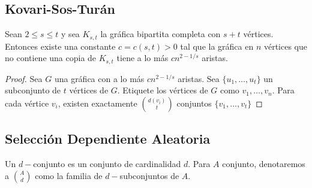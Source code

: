 \subsection{Kovari-Sos-Turán}
\begin{theorem}
Sean $2 \leq s \leq t$ y sea $K_{s,t}$ la gráfica bipartita
completa con $s + t$ vértices. Entonces existe una constante $c =
c(s, t) > 0$ tal que
la gráfica en $n$ vértices que no contiene una copia de $K_{s, t}$
tiene a lo más
$c n^{2 - 1/s}$ aristas.
\end{theorem}
\begin{proof}
Sea $G$ una gráfica con a lo más $cn^{2 - 1/s}$ aristas.
Sea $\{u_1, \ldots, u_t\}$ un subconjunto de $t$ vértices de $G$.
Etiquete los vértices de $G$ como $v_1, \ldots, v_n$. Para cada vértice
$v_i$, existen exactamente $\binom{d(v_i)}{t}$ conjuntos $\{v_1,
\ldots, v_t\}$
\end{proof}

\subsection{Selección Dependiente Aleatoria}

Un $d-$conjunto es un conjunto de cardinalidad $d$. Para $A$
conjunto, denotaremos a $\binom{A}{d}$ como la familia de
$d-$subconjuntos de $A$.

